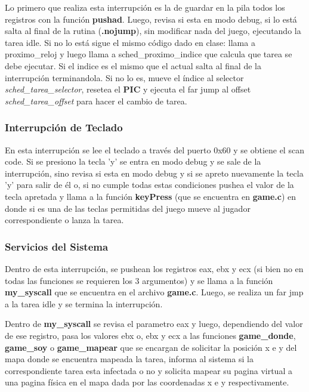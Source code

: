 Lo primero que realiza esta interrupción es la de guardar en la pila todos los registros con la función \textbf{pushad}. Luego, revisa si esta en modo debug, si lo está salta al final de la rutina (\textbf{.nojump}), sin modificar nada del juego, ejecutando la tarea idle.
Si no lo está sigue el mismo código dado en clase: llama a proximo_reloj y luego llama a sched_proximo_indice que calcula que tarea se debe ejecutar. Si el indice es el mismo que el actual salta al final de la interrupción terminandola. Si no lo es, mueve el índice al selector \textit{sched_tarea_selector}, resetea el \textbf{PIC} y ejecuta el far jump al offset \textit{sched_tarea_offset} para hacer el cambio de tarea.


\subsubsection{Interrupción de Teclado}

En esta interrupción se lee el teclado a través del puerto 0x60 y se obtiene el scan code. Si se presiono la tecla 'y' se entra en modo debug y se sale de la interrupción, sino revisa si esta en modo debug y si se apreto nuevamente la tecla 'y' para salir de él o, si no cumple todas estas condiciones pushea el valor de la tecla apretada y llama a la función \textbf{keyPress} (que se encuentra en \textbf{game.c}) en donde si es una de las teclas permitidas del juego mueve al jugador correspondiente o lanza la tarea.

\subsubsection{Servicios del Sistema}

Dentro de esta interrupción, se pushean los registros eax, ebx y ecx (si bien no en todas las funciones se requieren los 3 argumentos) y se llama a la función \textbf{my_syscall} que se encuentra en el archivo \textbf{game.c}. Luego, se realiza un far jmp a la tarea idle y se termina la interrupción.

Dentro de \textbf{my_syscall} se revisa el parametro eax y luego, dependiendo del valor de ese registro, pasa los valores ebx o, ebx y ecx a las funciones \textbf{game_donde}, \textbf{game_soy} o \textbf{game_mapear} que se encargan de solicitar la posición x e y del mapa donde se encuentra mapeada la tarea, informa al sistema si la correspondiente tarea esta infectada o no y solicita mapear su pagina virtual a una pagina física en el mapa dada por las coordenadas x e y respectivamente.